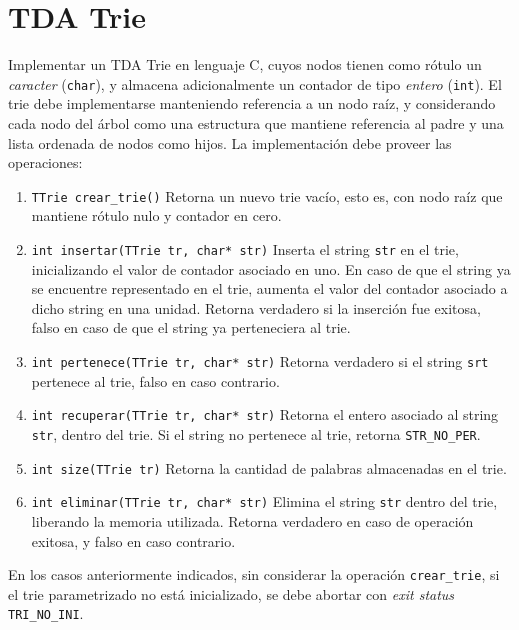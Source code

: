 \documentclass[12pt,a4paper]{article}
\begin{document}
\section{TDA Trie}

Implementar un TDA Trie en lenguaje C, cuyos nodos tienen como rótulo un \emph{caracter} (\texttt{char}), y almacena adicionalmente un contador de tipo \emph{entero} (\texttt{int}). El trie debe implementarse manteniendo referencia a un nodo raíz, y considerando cada nodo del árbol como una estructura que mantiene referencia al padre y una lista ordenada de nodos como hijos. La implementación debe proveer las operaciones:

\begin{enumerate}
	
	\item \texttt{TTrie crear\_trie()} Retorna un nuevo trie vacío, esto es, con nodo raíz que mantiene rótulo nulo y contador en cero.
	
	\item \texttt{int insertar(TTrie tr, char* str)} Inserta el string \texttt{str} en el trie, inicializando el valor de contador asociado en uno. En caso de que el string ya se encuentre representado en el trie, aumenta el valor del contador asociado a dicho string en una unidad. Retorna verdadero si la inserción fue exitosa, falso en caso de que el string ya perteneciera al trie.

	\item \texttt{int pertenece(TTrie tr, char* str)} Retorna verdadero si el string \texttt{srt} pertenece al trie, falso en caso contrario.
	
	\item \texttt{int recuperar(TTrie tr, char* str)} Retorna el entero asociado al string \texttt{str}, dentro del trie. Si el string no pertenece al trie, retorna \texttt{STR\_NO\_PER}.

	\item \texttt{int size(TTrie tr)} Retorna la cantidad de palabras almacenadas en el trie.
	
	\item \texttt{int eliminar(TTrie tr, char* str)} Elimina el string \texttt{str} dentro del trie, liberando la memoria utilizada. Retorna verdadero en caso de operación exitosa, y falso en caso contrario.
		
\end{enumerate}

En los casos anteriormente indicados, sin considerar la operación \texttt{crear\_trie}, si el trie parametrizado no está inicializado, se debe abortar con \emph{exit status} \texttt{TRI\_NO\_INI}. \\
\end{document}
